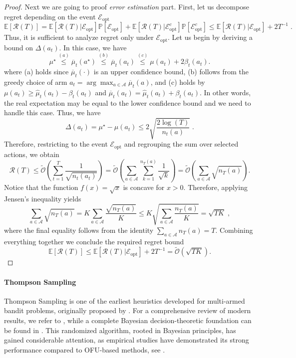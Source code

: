 \documentclass{article}
\numberwithin{equation}{section}
\newcommand{\E}{\mathbb E}
\newcommand{\cA}{\mathcal{A}}
\newcommand{\cE}{\mathcal{E}}
\newcommand{\eqsp}{\;}
\begin{document}
\begin{proof}
    Next we are going to proof \textit{error estimation} part. First, let us decompose regret depending on the event $\cE_{\text{opt}}$
    \[
        \E[\mathcal{R}(T)] = \E[\mathcal{R}(T) | \cE_{\text{opt}}] \mathbb{P}[\cE_{\text{opt}}] + \E\left[\mathcal{R}(T) | {\cE^c_{\text{opt}}}\right] \mathbb{P}\left[{\cE^c_{\text{opt}}}\right] \leq \E[\mathcal{R}(T) | \cE_{\text{opt}}] + 2 T^{-1}\eqsp.
    \]
    Thus, it is sufficient to analyze regret only under $\cE_{\text{opt}}$.  Let us begin by deriving a bound on $\Delta(a_t)$. In this case, we have
    \[
        \mu^\star \overset{(a)}{\leq} \overline{\mu}_t(a^\star) \overset{(b)}{\leq}\overline{\mu}_t(a_t) \overset{(c)}{\leq}\mu(a_t) + 2 \beta_t(a_t).
    \]
    where (a) holds since \(\overline{\mu}_t(\cdot)\) is an upper confidence bound, (b) follows from the greedy choice of arm \(a_t = \arg\max_{a \in \mathcal{A}} \overline{\mu}_t(a)\), and (c) holds by \(\mu(a_t) \geq \widehat{\mu}_t(a_t) - \beta_t(a_t)\) and \(\overline{\mu}_t(a_t) = \widehat{\mu}_t(a_t) + \beta_t(a_t)\). In other words, the real expectation may be equal to the lower confidence bound and we need to handle this case. Thus, we have
    \[
        \Delta(a_t) = \mu^\star - \mu(a_t) \leq 2 \sqrt{\frac{2\log(T)}{n_t(a)}}\eqsp.
    \]
    Therefore, restricting to the event \(\mathcal{E}_{\mathrm{opt}}\) and regrouping the sum over selected actions, we obtain
    \[
        \mathcal{R}(T) \leq \widetilde{\mathcal{O}}\left(\sum_{t=1}^T \frac{1}{\sqrt{n_t(a_t)}} \right) = \widetilde{\mathcal{O}}\left(\sum_{a \in \cA} \sum_{k=1}^{n_T(a)} \frac{1}{\sqrt{k}} \right) = \widetilde{\mathcal{O}}\left(\sum_{a \in \cA} \sqrt{n_T(a)} \right).
    \]
     Notice that the function $f(x) = \sqrt{x}$ is concave for $x>0$. Therefore, applying Jensen's inequality yields
    \[
        \sum_{a \in \cA} \sqrt{n_T(a)} = K \sum_{a \in \cA} \frac{\sqrt{n_T(a)}}{K}  \leq K \sqrt{\sum_{a \in \cA} \frac{n_T(a)}{K}} = \sqrt{TK}\eqsp,
    \]
    where the final equality follows from the identity $\sum_{a \in \cA} n_T(a) = T$.
    Combining everything together we conclude the required regret bound
    \[
        \E[\mathcal{R}(T)]  \leq \E[\mathcal{R}(T) | \cE_{\text{opt}}] + 2 T^{-1} = \widetilde{\mathcal{O}}(\sqrt{TK}).
    \]
\end{proof}

\paragraph{Thompson Sampling}
Thompson Sampling is one of the earliest heuristics developed for multi-armed bandit problems, originally proposed by \citet{thompson1933likelihood}. For a comprehensive review of modern results, we refer to \cite{russo2018tutorial}, while a complete Bayesian decision-theoretic foundation can be found in \cite{lattimore2020bandit}. This randomized algorithm, rooted in Bayesian principles, has gained considerable attention, as empirical studies have demonstrated its strong performance compared to OFU-based methods, see \cite{chapelle2011empirical}.
\end{document}
